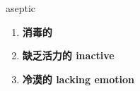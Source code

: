 
\begin{frame}
{\huge aseptic}
\begin{center}
\begin{enumerate}\Large
  \item \textbf{消毒的}
  \item \textbf{缺乏活力的 inactive}
  \item \textbf{冷漠的 lacking emotion}
\end{enumerate}
\end{center}
\end{frame}
